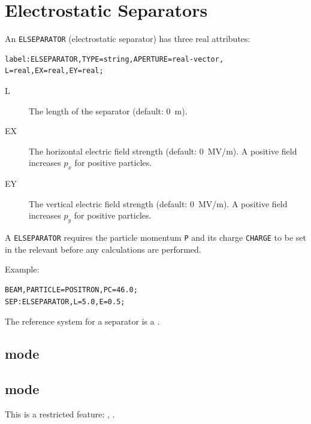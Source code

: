 \section{Electrostatic Separators}
\label{sec:separator}
An \texttt{ELSEPARATOR} (electrostatic separator) has three real
attributes:
\begin{verbatim}
label:ELSEPARATOR,TYPE=string,APERTURE=real-vector,
L=real,EX=real,EY=real;
\end{verbatim}
\begin{description}
\item[L]
  The length of the separator (default: 0~m).
\item[EX]
  The horizontal electric field strength (default: 0~MV/m).
  A positive field increases $p_x$ for positive particles.
\item[EY]
  The vertical electric field strength (default: 0~MV/m).
  A positive field increases $p_y$ for positive particles.
\end{description}
A \texttt{ELSEPARATOR} requires the particle momentum \texttt{P} 
and its charge \texttt{CHARGE} to be set in the relevant
 before any calculations are performed.

\noindent Example:
\begin{verbatim}
BEAM,PARTICLE=POSITRON,PC=46.0;
SEP:ELSEPARATOR,L=5.0,E=0.5;
\end{verbatim}
The reference system for a separator is a 
.
\subsection{\opalt mode}

\subsection{\opalcycl mode}

This is a restricted feature: \noopalt, \noopalcycl .

